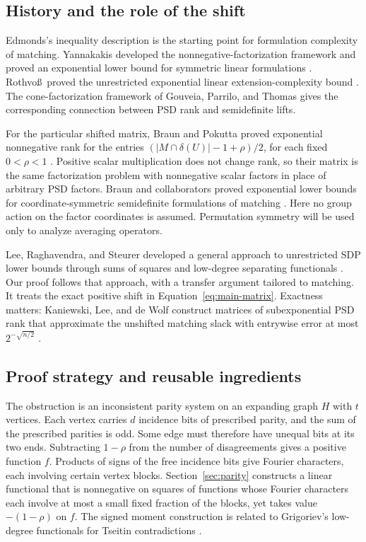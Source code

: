 \subsection{History and the role of the shift}

Edmonds's inequality description \cite{edmonds} is the starting
point for formulation complexity of matching.  Yannakakis
developed the nonnegative-factorization framework and proved an
exponential lower bound for symmetric linear formulations
\cite{yannakakis}.  Rothvo\ss\ proved the unrestricted exponential
linear extension-complexity bound \cite{rothvoss}.  The
cone-factorization framework of Gouveia, Parrilo, and Thomas
\cite{gpt} gives the corresponding connection between PSD rank
and semidefinite lifts.

For the particular shifted matrix, Braun and Pokutta proved
exponential nonnegative rank for the entries
$(|M\cap\delta(U)|-1+\rho)/2$, for each fixed $0<\rho<1$
\cite[Section~2.2.3 and Theorem~3.1]{braun-pokutta}.
Positive scalar multiplication does not change rank, so their
matrix is the same factorization problem with nonnegative scalar
factors in place of arbitrary PSD factors.  Braun and collaborators
proved exponential lower bounds for coordinate-symmetric
semidefinite formulations of matching
\cite[Definition~2.2 and Theorem~3.10]{matching-symmetric}.
Here no group action on the factor coordinates is assumed.
Permutation symmetry will be used only to analyze averaging
operators.

Lee, Raghavendra, and Steurer developed a general approach to
unrestricted SDP lower bounds through sums of squares and
low-degree separating functionals \cite{lrs}.  Our proof follows
that approach, with a transfer argument tailored to matching.
It treats the exact positive shift in Equation~\eqref{eq:main-matrix}.
Exactness matters: Kaniewski, Lee, and de Wolf construct matrices
of subexponential PSD rank that approximate the unshifted matching
slack with entrywise error at most $2^{-\sqrt{n/2}}$
\cite[Section~7.3 and Theorem~19]{kaniewski-lee-dewolf}.

\subsection{Proof strategy and reusable ingredients}

The obstruction is an inconsistent parity system on an expanding
graph $H$ with $t$ vertices.  Each vertex carries $d$ incidence
bits of prescribed parity, and the sum of the prescribed parities
is odd.  Some edge must therefore have unequal bits at its two
ends.  Subtracting $1-\rho$ from the number of disagreements gives
a positive function $f$.  Products of signs of the free incidence
bits give Fourier characters, each involving certain vertex blocks.
Section~\ref{sec:parity} constructs a linear functional that is
nonnegative on squares of functions whose Fourier characters each
involve at most a small fixed fraction of the blocks, yet takes
value $-(1-\rho)$ on $f$.  The signed
moment construction is related to Grigoriev's low-degree
functionals for Tseitin contradictions \cite{grigoriev}.

